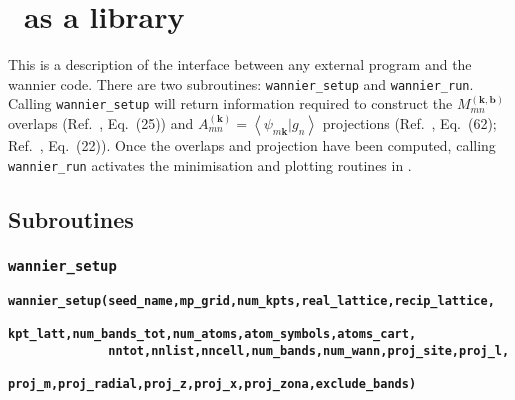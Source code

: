 \chapter{\wannier\ as a library}\label{ch:wann-lib}

This is a description of the interface between any external program and
the wannier code. There are two subroutines: \verb#wannier_setup# and
\verb#wannier_run#. Calling \verb#wannier_setup# will return
information required to 
construct the $M_{mn}^{(\mathbf{k,b})}$ overlaps (Ref.~\cite{MV},
Eq.~(25)) and $A_{mn}^{(\mathbf{k})}=\left\langle
\psi_{m\mathbf{k}}|g_{n}\right\rangle$ projections (Ref.~\cite{MV},
Eq.~(62); Ref.~\cite{SMV}, Eq.~(22)). Once 
the overlaps and projection have been computed, calling
\verb#wannier_run# activates the minimisation and plotting routines in
\wannier.


\section{Subroutines}

\subsection{{\tt wannier\_setup}}

{\noindent \bf \verb#wannier_setup(seed_name,mp_grid,num_kpts,real_lattice,recip_lattice,#\\
\verb#              kpt_latt,num_bands_tot,num_atoms,atom_symbols,atoms_cart,#\\
\verb#              nntot,nnlist,nncell,num_bands,num_wann,proj_site,proj_l,#\\
\verb#              proj_m,proj_radial,proj_z,proj_x,proj_zona,exclude_bands)   #}


